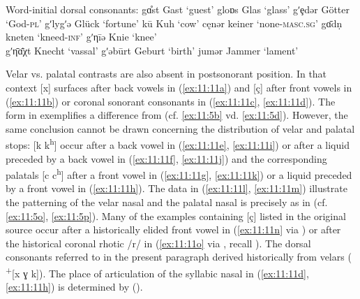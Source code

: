 \ea%
\label{ex:11:10}Word-initial dorsal consonants:
\ea\label{ex:11:10a} gɑ̊st \tab [kast] \tab Gast \tab ‘guest’ 
\ex\label{ex:11:10b} gloɒs \tab [kloɒs] \tab Glas \tab ‘glass’ 
\ex\label{ex:11:10c} gʹȩdər \tab [cɛtər] \tab Götter \tab ‘God-\textsc{pl}’ 
\ex\label{ex:11:10d} gʹlygʹə \tab [clʏcə] \tab Glück \tab ‘fortune’ 
\ex\label{ex:11:10e} kū \tab [k\textsuperscript{h}uː] \tab  Kuh \tab ‘cow’ 
\ex\label{ex:11:10f} cęnər  \tab  keiner \tab ‘none\textsc{{}-masc.sg}’ 
\ex\label{ex:11:10g} gɑ̄dṇ \tab [kŋɑːtn̩] \tab  kneten \tab ‘kneed\textsc{{}-inf}’ 
\ex\label{ex:11:10h} gʹηīə \tab  [cɲiːə] \tab  Knie \tab ‘knee’ \\
    gʹη̄ɑ̇̄χt \tab [cɲæːçt] \tab  Knecht \tab ‘vassal’ 
\ex\label{ex:11:10i} gʹəbūrt \tab [cəpuːʀt] \tab Geburt \tab ‘birth’ 
\ex\label{ex:11:10j} jumər \tab  [ʝʊməʀ] \tab Jammer \tab ‘lament’  
    \z
\z 

Velar vs. palatal contrasts are also absent in postsonorant position. In that context [x] surfaces after back vowels in (\ref{ex:11:11a}) and [ç] after front vowels in (\ref{ex:11:11b}) or coronal sonorant consonants in (\ref{ex:11:11c}, \ref{ex:11:11d}). The form in  exemplifies a difference from  (cf. \ref{ex:11:5b} vd. \ref{ex:11:5d}). However, the same conclusion cannot be drawn concerning the distribution of velar and palatal stops: [k k\textsuperscript{h}] occur after a back vowel in (\ref{ex:11:11e}, \ref{ex:11:11i}) or after a liquid preceded by a back vowel in (\ref{ex:11:11f}, \ref{ex:11:11j}) and the corresponding palatals [c c\textsuperscript{h}] after a front vowel in (\ref{ex:11:11g}, \ref{ex:11:11k}) or a liquid preceded by a front vowel in (\ref{ex:11:11h}). The data in (\ref{ex:11:11l}, \ref{ex:11:11m}) illustrate the patterning of the velar nasal and the palatal nasal is precisely as in  (cf. \ref{ex:11:5o}, \ref{ex:11:5p}). Many of the examples containing [ç] listed in the original source occur after a historically elided front vowel in (\ref{ex:11:11n} via ) or after the historical coronal rhotic /r/ in (\ref{ex:11:11o} via , recall ). The dorsal consonants referred to in the present paragraph derived historically from velars ( \textsuperscript{+}[x ɣ k]). The place of articulation of the syllabic nasal in (\ref{ex:11:11d}, \ref{ex:11:11h}) is determined by  ().


